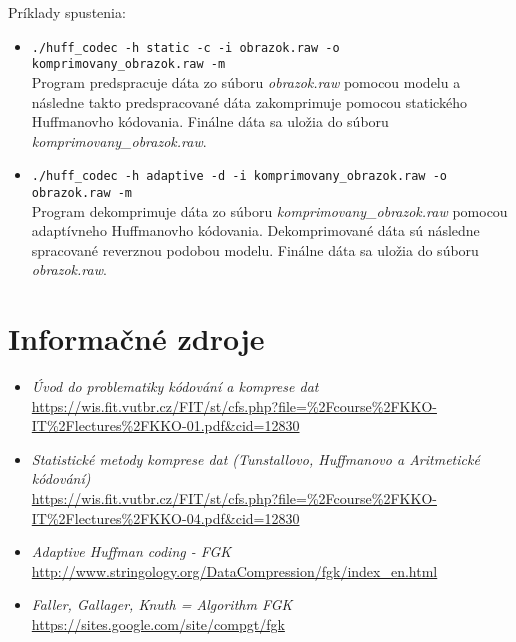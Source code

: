 \documentclass[10pt,a4paper]{article}
\begin{document}
Príklady spustenia:
\begin{itemize}
	\item \texttt{./huff\_codec -h static -c -i obrazok.raw -o komprimovany\_obrazok.raw -m} \\
		  Program predspracuje dáta zo súboru \textit{obrazok.raw} pomocou modelu a následne takto predspracované dáta zakomprimuje pomocou statického Huffmanovho kódovania. Finálne dáta sa uložia do súboru \textit{komprimovany\_obrazok.raw}.
	\item \texttt{./huff\_codec -h adaptive -d -i komprimovany\_obrazok.raw -o obrazok.raw -m} \\
		Program dekomprimuje dáta zo súboru \textit{komprimovany\_obrazok.raw} pomocou adaptívneho Huffmanovho kódovania. Dekomprimované dáta sú následne spracované reverznou podobou modelu. Finálne dáta sa uložia do súboru \textit{obrazok.raw}.
\end{itemize}

\section{Informačné zdroje}
\begin{itemize}
	\item \textit{Úvod do problematiky kódování a komprese dat}\\
	\url{https://wis.fit.vutbr.cz/FIT/st/cfs.php?file=%2Fcourse%2FKKO-IT%2Flectures%2FKKO-01.pdf&cid=12830}
	
	\item \textit{Statistické metody komprese dat (Tunstallovo, Huffmanovo a Aritmetické kódování)}\\
	\url{https://wis.fit.vutbr.cz/FIT/st/cfs.php?file=%2Fcourse%2FKKO-IT%2Flectures%2FKKO-04.pdf&cid=12830}
		
	\item \textit{Adaptive Huffman coding - FGK}\\
	\url{http://www.stringology.org/DataCompression/fgk/index_en.html}

	\item \textit{Faller, Gallager, Knuth = Algorithm FGK}\\
	\url{https://sites.google.com/site/compgt/fgk}
\end{itemize}
\end{document}
